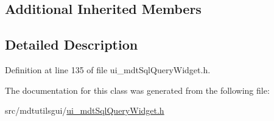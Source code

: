 \subsection*{Additional Inherited Members}


\subsection{Detailed Description}


Definition at line 135 of file ui\-\_\-mdt\-Sql\-Query\-Widget.\-h.



The documentation for this class was generated from the following file\-:\begin{DoxyCompactItemize}
\item 
src/mdtutilsgui/\hyperlink{ui__mdt_sql_query_widget_8h}{ui\-\_\-mdt\-Sql\-Query\-Widget.\-h}\end{DoxyCompactItemize}
